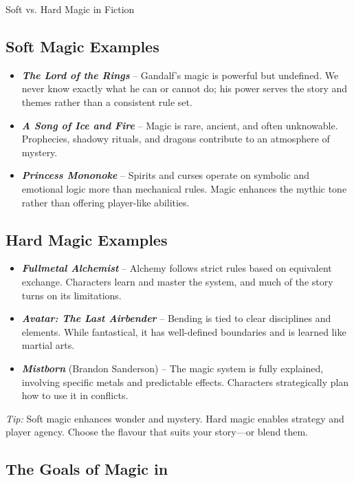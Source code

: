 \begin{CommentBox}{Soft vs. Hard Magic in Fiction}
    \subsection*{Soft Magic Examples}
    \begin{itemize}
        \item \textbf{\emph{The Lord of the Rings}} – Gandalf’s magic is powerful but undefined. We never know exactly what he can or cannot do; his power serves the story and themes rather than a consistent rule set.
        \item \textbf{\emph{A Song of Ice and Fire}} – Magic is rare, ancient, and often unknowable. Prophecies, shadowy rituals, and dragons contribute to an atmosphere of mystery.
        \item \textbf{\emph{Princess Mononoke}} – Spirits and curses operate on symbolic and emotional logic more than mechanical rules. Magic enhances the mythic tone rather than offering player-like abilities.
    \end{itemize}
    
    \subsection*{Hard Magic Examples}
    \begin{itemize}
        \item \textbf{\emph{Fullmetal Alchemist}} – Alchemy follows strict rules based on equivalent exchange. Characters learn and master the system, and much of the story turns on its limitations.
        \item \textbf{\emph{Avatar: The Last Airbender}} – Bending is tied to clear disciplines and elements. While fantastical, it has well-defined boundaries and is learned like martial arts.
        \item \textbf{\emph{Mistborn}} (Brandon Sanderson) – The magic system is fully explained, involving specific metals and predictable effects. Characters strategically plan how to use it in conflicts.
    \end{itemize}
    
    \noindent
    \textit{Tip:} Soft magic enhances wonder and mystery. Hard magic enables strategy and player agency. Choose the flavour that suits your story—or blend them.
\end{CommentBox}
    

\subsection{The Goals of Magic in \wyrd}

